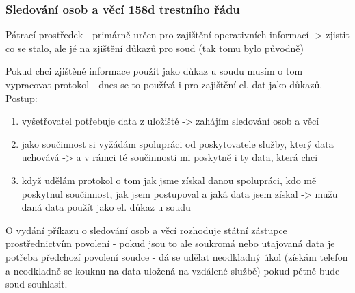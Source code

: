 \subsubsection*{Sledování osob a věcí 158d trestního řádu}
Pátrací prostředek - primárně určen pro zajištění operativních informací -> zjistit co se
stalo, ale jé na zjištění důkazů pro soud (tak tomu bylo původně)

Pokud chci zjištěné informace použít jako důkaz u soudu musím o tom vypracovat protokol - dnes se to používá i pro
zajištění el. dat jako důkazů. Postup:
\begin{enumerate}
    \item vyšetřovatel potřebuje data z uložiště -> zahájím sledování osob a věcí
    \item jako součinnost si vyžádám spolupráci od poskytovatele služby, který data uchovává -> a v rámci té součinnosti mi poskytně i ty data, která chci
    \item když udělám protokol o tom jak jsme získal danou spolupráci, kdo mě poskytnul součinnost, jak jsem postupoval a jaká data jsem získal -> mužu daná data použít jako el. důkaz u soudu
\end{enumerate}
O vydání příkazu o sledování osob a věcí rozhoduje státní zástupce prostřednictvím povolení - pokud jsou to ale soukromá nebo utajovaná data je potřeba předchozí povolení soudce - dá se udělat neodkladný úkol (získám telefon a neodkladně se kouknu na data uložená na vzdálené službě) pokud pětně bude soud souhlasit.

